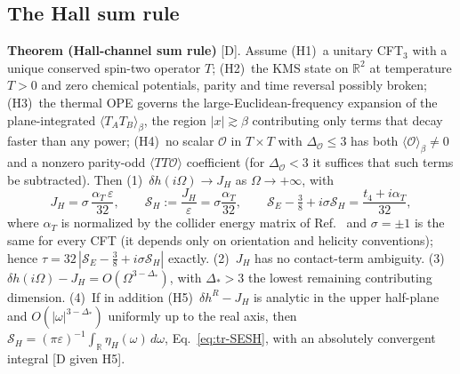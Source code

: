 \subsection{The Hall sum rule}
\textbf{Theorem (Hall-channel sum rule)} [D]. Assume
(H1)~a unitary CFT$_3$ with a unique conserved spin-two operator $T$;
(H2)~the KMS state on $\mathbb R^2$ at temperature $T>0$ and zero chemical potentials, parity and time reversal possibly broken;
(H3)~the thermal OPE governs the large-Euclidean-frequency expansion of the plane-integrated $\langle T_AT_B\rangle_\beta$, the region
$|x|\gtrsim\beta$ contributing only terms that decay faster than any power;
(H4)~no scalar $\mathcal O$ in $T\times T$ with $\Delta_{\mathcal O}\le3$ has both $\langle\mathcal O\rangle_\beta\ne0$ and a nonzero parity-odd
$\langle TT\mathcal O\rangle$ coefficient (for $\Delta_{\mathcal O}<3$ it suffices that such terms be subtracted). Then
(1)~$\delta h(i\Omega)\to J_H$ as $\Omega\to+\infty$, with
\begin{equation}
J_H=\sigma\,\frac{\alpha_T\,\varepsilon}{32},\qquad \mathcal S_H:=\frac{J_H}\varepsilon=\sigma\frac{\alpha_T}{32},\qquad
\mathcal S_E-\tfrac38+i\sigma\mathcal S_H=\frac{t_4+i\alpha_T}{32},
\label{eq:tr-SHthm}
\end{equation}
where $\alpha_T$ is normalized by the collider energy matrix of Ref.~\cite{CDPrakash} and $\sigma=\pm1$ is the same for every CFT
(it depends only on orientation and helicity conventions); hence $\tau=32\,|\mathcal S_E-\tfrac38+i\sigma\mathcal S_H|$ exactly.
(2)~$J_H$ has no contact-term ambiguity. (3)~$\delta h(i\Omega)-J_H=O(\Omega^{3-\Delta_*})$, with $\Delta_*>3$ the lowest remaining
contributing dimension. (4)~If in addition (H5)~$\delta h^R-J_H$ is analytic in the upper half-plane and $O(|\omega|^{3-\Delta_*})$
uniformly up to the real axis, then $\mathcal S_H=(\pi\varepsilon)^{-1}\int_{\mathbb R}\eta_H(\omega)\,d\omega$, Eq.~\eqref{eq:tr-SESH},
with an absolutely convergent integral [D given H5].

